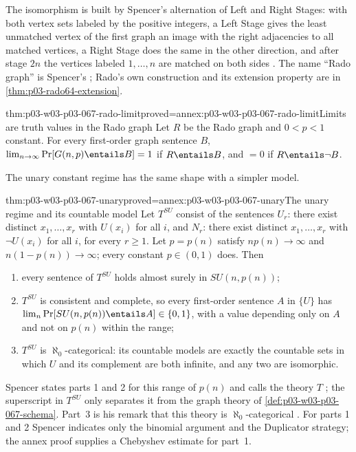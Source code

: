 The isomorphism is built by Spencer's alternation of Left and Right Stages:
with both vertex sets labeled by the positive integers, a Left Stage gives the
least unmatched vertex of the first graph an image with the right adjacencies
to all matched vertices, a Right Stage does the same in the other direction,
and after stage \(2n\) the vertices labeled \(1,\ldots,n\) are matched on both
sides \cite[pp.~13--14]{Spencer2007LogicRandomStructuresAuthor}.  The name
``Rado graph'' is Spencer's \cite[p.~14]{Spencer2007LogicRandomStructuresAuthor};
Rado's own construction and its extension property are in
\cref{thm:p03-rado64-extension}.

\begin{hbcorollary}{thm:p03-w03-p03-067-rado-limit}{proved=annex:p03-w03-p03-067-rado-limit}{Limits are truth values in the Rado graph}
Let \(R\) be the Rado graph and \(0<p<1\) constant.  For every first-order
graph sentence \(B\),
\(\lim_{n\to\infty}\Pr[G(n,p)\entails B]=1\) if \(R\entails B\), and \(=0\)
if \(R\entails\neg B\).
\end{hbcorollary}

The unary constant regime has the same shape with a simpler model.

\begin{hbtheorem}{thm:p03-w03-p03-067-unary}{proved=annex:p03-w03-p03-067-unary}{The unary regime and its countable model}
Let \(T^{SU}\) consist of the sentences \(U_r\): there exist distinct
\(x_1,\ldots,x_r\) with \(U(x_i)\) for all \(i\), and \(N_r\): there exist
distinct \(x_1,\ldots,x_r\) with \(\neg U(x_i)\) for all \(i\), for every
\(r\geq1\).  Let \(p=p(n)\) satisfy \(np(n)\to\infty\) and
\(n(1-p(n))\to\infty\); every constant \(p\in(0,1)\) does.  Then
\begin{enumerate}
\item every sentence of \(T^{SU}\) holds almost surely in \(SU(n,p(n))\);
\item \(T^{SU}\) is consistent and complete, so every first-order sentence
  \(A\) in \(\{U\}\) has \(\lim_n\Pr[SU(n,p(n))\entails A]\in\{0,1\}\), with a
  value depending only on \(A\) and not on \(p(n)\) within the range;
\item \(T^{SU}\) is \(\aleph_0\)-categorical: its countable models are
  exactly the countable sets in which \(U\) and its complement are both
  infinite, and any two are isomorphic.
\end{enumerate}
\end{hbtheorem}

Spencer states parts 1 and 2 for this range of \(p(n)\) and calls the theory
\(T\) \cite[p.~3]{Spencer2007LogicRandomStructuresAuthor}; the superscript in
\(T^{SU}\) only separates it from the graph theory of
\cref{def:p03-w03-p03-067-schema}.  Part~3 is his remark that this theory is
\(\aleph_0\)-categorical \cite[p.~4]{Spencer2007LogicRandomStructuresAuthor}.
For parts 1 and 2 Spencer indicates only the binomial argument and the
Duplicator strategy; the annex proof supplies a Chebyshev estimate for part~1.

